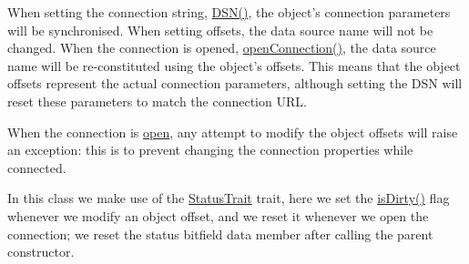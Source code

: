 When setting the connection string, \hyperlink{class_ontology_wrapper_1_1_connection_object_a9a013bdb9589e847926d196de62e87e3}{D\-S\-N()}, the object's connection parameters will be synchronised. When setting offsets, the data source name will not be changed. When the connection is opened, \hyperlink{class_ontology_wrapper_1_1_connection_object_aa65904a3e38f1b04cdea1d88dd80793b}{open\-Connection()}, the data source name will be re-\/constituted using the object's offsets. This means that the object offsets represent the actual connection parameters, although setting the D\-S\-N will reset these parameters to match the connection U\-R\-L.

When the connection is \hyperlink{class_ontology_wrapper_1_1_connection_object_abfd8e3b96ce288b2d1b1e586e8e7172a}{open}, any attempt to modify the object offsets will raise an exception\-: this is to prevent changing the connection properties while connected.

In this class we make use of the \hyperlink{}{Status\-Trait} trait, here we set the \hyperlink{namespace_ontology_wrapper_ad6a1ce4470a565eb806bf842a2b38aaf}{is\-Dirty()} flag whenever we modify an object offset, and we reset it whenever we open the connection; we reset the status bitfield data member after calling the parent constructor.

